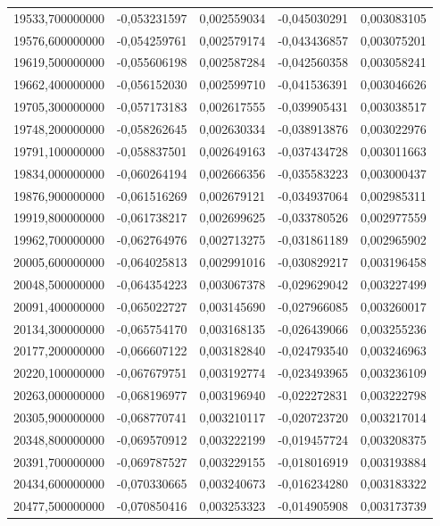 \begin{longtable}{rrrrr}
19533,700000000 & -0,053231597 & 0,002559034 & -0,045030291 & 0,003083105\\
19576,600000000 & -0,054259761 & 0,002579174 & -0,043436857 & 0,003075201\\
19619,500000000 & -0,055606198 & 0,002587284 & -0,042560358 & 0,003058241\\
19662,400000000 & -0,056152030 & 0,002599710 & -0,041536391 & 0,003046626\\
19705,300000000 & -0,057173183 & 0,002617555 & -0,039905431 & 0,003038517\\
19748,200000000 & -0,058262645 & 0,002630334 & -0,038913876 & 0,003022976\\
19791,100000000 & -0,058837501 & 0,002649163 & -0,037434728 & 0,003011663\\
19834,000000000 & -0,060264194 & 0,002666356 & -0,035583223 & 0,003000437\\
19876,900000000 & -0,061516269 & 0,002679121 & -0,034937064 & 0,002985311\\
19919,800000000 & -0,061738217 & 0,002699625 & -0,033780526 & 0,002977559\\
19962,700000000 & -0,062764976 & 0,002713275 & -0,031861189 & 0,002965902\\
20005,600000000 & -0,064025813 & 0,002991016 & -0,030829217 & 0,003196458\\
20048,500000000 & -0,064354223 & 0,003067378 & -0,029629042 & 0,003227499\\
20091,400000000 & -0,065022727 & 0,003145690 & -0,027966085 & 0,003260017\\
20134,300000000 & -0,065754170 & 0,003168135 & -0,026439066 & 0,003255236\\
20177,200000000 & -0,066607122 & 0,003182840 & -0,024793540 & 0,003246963\\
20220,100000000 & -0,067679751 & 0,003192774 & -0,023493965 & 0,003236109\\
20263,000000000 & -0,068196977 & 0,003196940 & -0,022272831 & 0,003222798\\
20305,900000000 & -0,068770741 & 0,003210117 & -0,020723720 & 0,003217014\\
20348,800000000 & -0,069570912 & 0,003222199 & -0,019457724 & 0,003208375\\
20391,700000000 & -0,069787527 & 0,003229155 & -0,018016919 & 0,003193884\\
20434,600000000 & -0,070330665 & 0,003240673 & -0,016234280 & 0,003183322\\
20477,500000000 & -0,070850416 & 0,003253323 & -0,014905908 & 0,003173739\\

\end{longtable}
